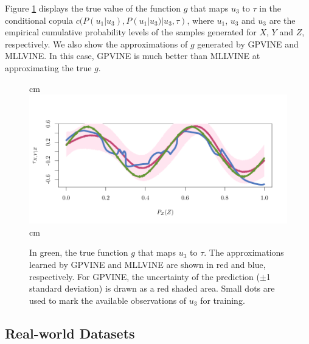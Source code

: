 \documentclass{article}
\begin{document}
Figure \ref{fig:syn} displays the true value of the function $g$ that maps
$u_3$ to $\tau$ in the conditional copula $c(P(u_1|u_3),P(u_1|u_3)|u_3,\tau)$, where
$u_1$, $u_3$ and $u_3$ are the empirical cumulative probability levels of the
samples generated for $X$, $Y$ and $Z$, respectively. We also show the
approximations of $g$ generated by GPVINE and MLLVINE.  In this case, GPVINE is
much better than MLLVINE at approximating the true $g$.

\begin{figure}
  \begin{center}
     cm
    \includegraphics[width=\linewidth]{figures/synthetic_plot.pdf}
     cm
    \caption{In green, the true function $g$ that maps $u_3$ to $\tau$.  The
    approximations learned by GPVINE and MLLVINE are shown in red and blue,
    respectively.  For GPVINE, the uncertainty of the prediction ($\pm$1
    standard deviation) is drawn as a red shaded area.  Small dots are used to
    mark the available observations of $u_3$ for training.}
    \label{fig:syn}
  \end{center}
\end{figure}

\subsection{Real-world Datasets}
\end{document}
